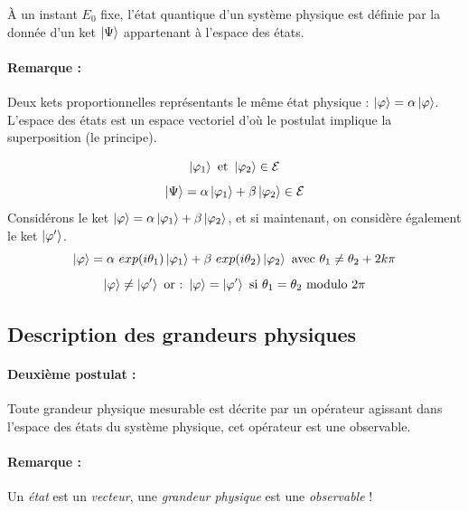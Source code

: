 \documentclass[12pt,a4paper,titlepage]{book}
\begin{document}
À un instant $E_0$ fixe, l'état quantique d'un système physique est définie par la donnée d'un ket $\ket \Psi$ appartenant à l'espace des états.

\paragraph*{Remarque :}

Deux kets proportionnelles représentants le même état physique : $\ket \varphi = \alpha \ket \varphi$. L'espace des états est un espace vectoriel d'où le postulat implique la superposition (le principe).

\begin{equation*}
\ket{\varphi_1} \text{ et } \ket{\varphi_2} \in \mathcal{E}
\end{equation*}
\begin{equation*}
\ket \Psi = \alpha\ket{\varphi_1} + \beta\ket{\varphi_2} \in \mathcal{E}
\end{equation*}
Considérons le ket $\ket \varphi = \alpha\ket{\varphi_1} + \beta\ket{\varphi_2}$, et si maintenant, on considère également le ket $\ket{\varphi'}$.
\begin{equation*}
\ket \varphi = \alpha ~exp(i \theta_1) \ket{\varphi_1} + \beta ~exp(i \theta_2)\ket{\varphi_2} ~\text{avec}~ \theta_1 \neq \theta_2 + 2k\pi
\end{equation*}
\begin{equation*}
\ket\varphi \neq \ket{\varphi'} ~\text{or :}~ \ket\varphi = \ket{\varphi'} ~\text{si}~ \theta_1 = \theta_2 \text{ modulo } 2\pi
\end{equation*}
\subsection{Description des grandeurs physiques}
\paragraph*{Deuxième postulat :}

Toute grandeur physique mesurable est décrite par un opérateur agissant dans l'espace des états du système physique, cet opérateur est une observable.

\paragraph*{Remarque :}

Un \textit{état} est un \textit{vecteur}, une \textit{grandeur physique} est une \textit{observable} !
\end{document}
